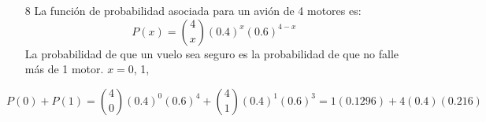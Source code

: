 \documentclass[10pt,letterpaper]{article}
\author{Germán Avendaño Ramírez}
\begin{document}
\begin{itemize}
\item[8] La función de probabilidad asociada para un avi\'{o}n de 4 motores es:
\[P(x)=\displaystyle{4 \choose x}(0.4)^{x}(0.6)^{4-x}\]
La probabilidad de que un vuelo sea seguro es la probabilidad de que no falle más de 1 motor.
$x=0$, 1, 
\end{itemize}
\[P(0)+P(1)=\displaystyle{4 \choose 0}(0.4)^{0}(0.6)^{4}+\displaystyle{4 \choose 1}(0.4)^{1}(0.6)^{3}=1(0.1296)+4(0.4)(0.216)\]
\end{document}
